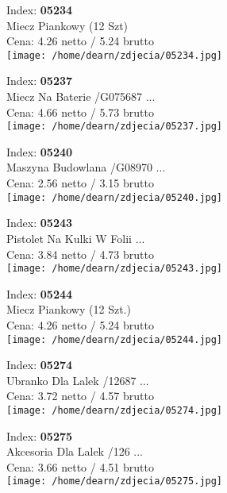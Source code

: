{Index: \textbf{05234}\\
Miecz Piankowy (12 Szt) \\
Cena: 4.26 netto / 5.24 brutto\\
  \texttt{[image: /home/dearn/zdjecia/05234.jpg]}}\newline\newline

{Index: \textbf{05237}\\
Miecz Na Baterie /G075687 ...\\
Cena: 4.66 netto / 5.73 brutto\\
  \texttt{[image: /home/dearn/zdjecia/05237.jpg]}}\newline\newline

{Index: \textbf{05240}\\
Maszyna Budowlana /G08970 ...\\
Cena: 2.56 netto / 3.15 brutto\\
  \texttt{[image: /home/dearn/zdjecia/05240.jpg]}}\newline\newline

{Index: \textbf{05243}\\
Pistolet Na Kulki W Folii ...\\
Cena: 3.84 netto / 4.73 brutto\\
  \texttt{[image: /home/dearn/zdjecia/05243.jpg]}}\newline\newline

{Index: \textbf{05244}\\
Miecz Piankowy (12 Szt.)\\
Cena: 4.26 netto / 5.24 brutto\\
  \texttt{[image: /home/dearn/zdjecia/05244.jpg]}}\newline\newline

{Index: \textbf{05274}\\
Ubranko Dla Lalek  /12687 ...\\
Cena: 3.72 netto / 4.57 brutto\\
  \texttt{[image: /home/dearn/zdjecia/05274.jpg]}}\newline\newline

{Index: \textbf{05275}\\
Akcesoria Dla Lalek  /126 ...\\
Cena: 3.66 netto / 4.51 brutto\\
  \texttt{[image: /home/dearn/zdjecia/05275.jpg]}}\newline\newline

